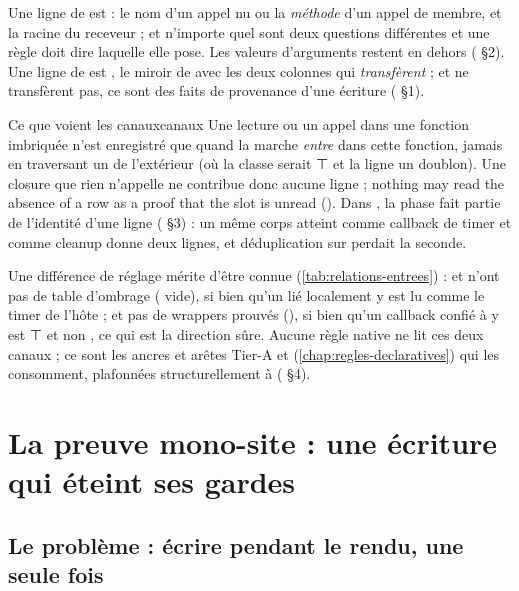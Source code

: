 Une ligne de  est  : le nom d'un appel nu ou la \emph{méthode} d'un appel de membre, et la racine du receveur ;  et n'importe quel  sont deux questions différentes et une règle doit dire laquelle elle pose. Les valeurs d'arguments restent en dehors ( §2). Une ligne de  est , le miroir de  avec les deux colonnes qui \emph{transfèrent} ;  et  ne transfèrent pas, ce sont des faits de provenance d'une écriture ( §1).

\begin{invariant}{Ce que voient les canaux}{canaux}
Une lecture ou un appel dans une fonction imbriquée n'est enregistré que quand la marche \emph{entre} dans cette fonction, jamais en traversant un  de l'extérieur (où la classe serait ⊤ et la ligne un doublon). Une closure que rien n'appelle ne contribue donc aucune ligne ; \og nothing may read the absence of a row as a proof that the slot is unread\fg{} (). Dans , la phase fait partie de l'identité d'une ligne ( §3) : un même corps atteint comme callback de timer et comme cleanup donne deux lignes, et déduplication sur  perdait la seconde.
\end{invariant}

Une différence de réglage mérite d'être connue (\cref{tab:relations-entrees}) :  et  n'ont pas de table d'ombrage ( vide), si bien qu'un  lié localement y est lu comme le timer de l'hôte ; et pas de wrappers prouvés (), si bien qu'un callback confié à  y est ⊤ et non , ce qui est la direction sûre. Aucune règle native ne lit ces deux canaux ; ce sont les ancres et arêtes Tier-A  et  (\cref{chap:regles-declaratives}) qui les consomment, plafonnées structurellement à \Warning{} ( §4).

\section{La preuve mono-site : une écriture qui éteint ses gardes}
\label{sec:relations-preuve-mono-site}
\subsection{Le problème : écrire pendant le rendu, une seule fois}

